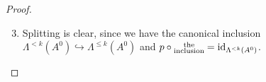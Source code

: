 \begin{proof}
  \begin{comment}
    \begin{enumerate}
      \item \PROBLEM[clear, since germwise clear?]
    \end{enumerate}
  \end{comment}
  \begin{comment}
    \begin{enumerate}
      \setcounter{enumi}{1}
      \item
        \PROBLEM[Germwise or sectionwise??, check only on generators?]
        Let $\alpha$ be an direction in $S^1$.
        Let $n\in\Lambda^k(A^0)_\alpha$ and $g\in\Lambda^{\leq k}(A^0)_\alpha$.
        We have to show, that $gng^{-1}\in\Lambda^{\leq k}(A^0)_\alpha$,
        i.e.\ that $gng^{-1}$ is a $k$-germ.
        \TODO{}
    \end{enumerate}
  \end{comment}
  \begin{enumerate}
    \setcounter{enumi}{2}
    \item Splitting is clear, since we have the canonical inclusion
      $\Lambda^{<k}(A^0)\hookrightarrow\Lambda^{\leq k}(A^0)$ and
      $p\circ\substack{\text{the}\\\text{inclusion}}=\operatorname{id}_{\Lambda^{<k}(A^0)}$.
  \end{enumerate}
\end{proof}
